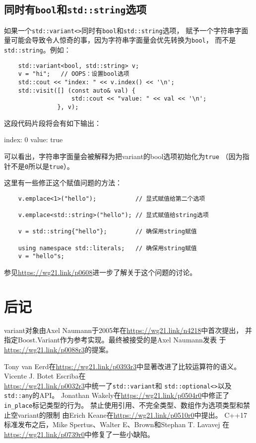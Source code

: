 \subsection{同时有\texttt{bool}和\texttt{std::string}选项}
如果一个\texttt{std::variant<>}同时有\texttt{bool}和\texttt{std::string}选项，
赋予一个字符串字面量可能会导致令人惊奇的事，因为字符串字面量会优先转换为\texttt{bool}，
而不是\texttt{std::string}。例如：
\begin{lstlisting}
    std::variant<bool, std::string> v;
    v = "hi";   // OOPS：设置bool选项
    std::cout << "index: " << v.index() << '\n';
    std::visit([] (const auto& val) {
                   std::cout << "value: " << val << '\n';
               }, v);
\end{lstlisting}
这段代码片段将会有如下输出：
\begin{blacklisting}
    index: 0
    value: true
\end{blacklisting}
可以看出，字符串字面量会被解释为把variant的bool选项初始化为\texttt{true}
（因为指针不是\texttt{0}所以是\texttt{true}）。

这里有一些修正这个赋值问题的方法：
\begin{lstlisting}
    v.emplace<1>("hello");           // 显式赋值给第二个选项

    v.emplace<std::string>("hello"); // 显式赋值给string选项

    v = std::string{"hello"};        // 确保用string赋值

    using namespace std::literals;   // 确保用string赋值
    v = "hello"s;
\end{lstlisting}
参见\url{https://wg21.link/p0608}进一步了解关于这个问题的讨论。


\section{后记}
variant对象由Axel Naumann于2005年在\url{https://wg21.link/n4218}中首次提出，
并指定Boost.Variant作为参考实现。最终被接受的是Axel Naumann发表
于\url{https://wg21.link/p0088r3}的提案。

Tony van Eerd在\url{https://wg21.link/p0393r3}中显著改进了比较运算符的语义。
Vicente J. Botet Escriba在\\
\url{https://wg21.link/p0032r3}中统一了\texttt{std::variant}和
\texttt{std::optional<>}以及\texttt{std::any}的API。
Jonathan Wakely在\url{https://wg21.link/p0504r0}中修正了
\texttt{in\_place}标记类型的行为。
禁止使用引用、不完全类型、数组作为选项类型和禁止空variant的限制
由Erich Keane在\url{https://wg21.link/p0510r0}中提出。
C++17标准发布之后，Mike Spertus、Walter E、Brown和Stephan T. Lavavej
在\url{https://wg21.link/p0739r0}中修复了一些小缺陷。
